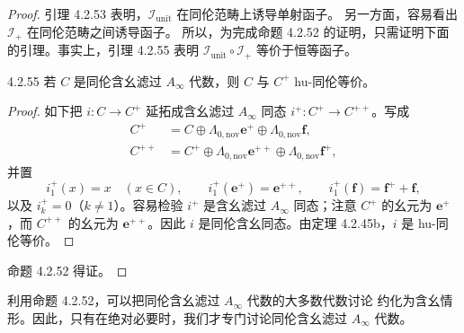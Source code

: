 \begin{proof}
引理 4.2.53 表明，$\mathcal I_{\mathrm{unit}}$ 在同伦范畴上诱导单射函子。
另一方面，容易看出 $\mathcal I_+$ 在同伦范畴之间诱导函子。
所以，为完成命题 4.2.52 的证明，只需证明下面的引理。事实上，引理
4.2.55 表明 $\mathcal I_{\mathrm{unit}}\circ\mathcal I_+$ 等价于恒等函子。

\begin{lemma}{4.2.55}\label{lem:4-2-55}
若 $C$ 是同伦含幺滤过 $A_\infty$ 代数，则 $C$ 与 $C^+$ hu-同伦等价。
\end{lemma}

\begin{proof}
如下把 $i\colon C\to C^+$ 延拓成含幺滤过 $A_\infty$ 同态
$i^+\colon C^+\to C^{++}$。写成
\[
 \begin{aligned}
 C^+&=C\oplus\Lambda_{0,\mathrm{nov}}\mathbf e^+
          \oplus\Lambda_{0,\mathrm{nov}}\mathbf f,\\
 C^{++}&=C^+\oplus\Lambda_{0,\mathrm{nov}}\mathbf e^{++}
          \oplus\Lambda_{0,\mathrm{nov}}\mathbf f^+,
 \end{aligned}
\]
并置
\[
 i_1^+(x)=x\quad(x\in C),
 \qquad
 i_1^+(\mathbf e^+)=\mathbf e^{++},
 \qquad
 i_1^+(\mathbf f)=\mathbf f^++\mathbf f,
\]
以及 $i_k^+=0$（$k\ne1$）。容易检验 $i^+$ 是含幺滤过
$A_\infty$ 同态；注意 $C^+$ 的幺元为 $\mathbf e^+$，而 $C^{++}$ 的幺元为
$\mathbf e^{++}$。因此 $i$ 是同伦含幺同态。由定理 4.2.45b，$i$ 是
hu-同伦等价。
\end{proof}

命题 4.2.52 得证。
\end{proof}

利用命题 4.2.52，可以把同伦含幺滤过 $A_\infty$ 代数的大多数代数讨论
约化为含幺情形。因此，只有在绝对必要时，我们才专门讨论同伦含幺滤过
$A_\infty$ 代数。
